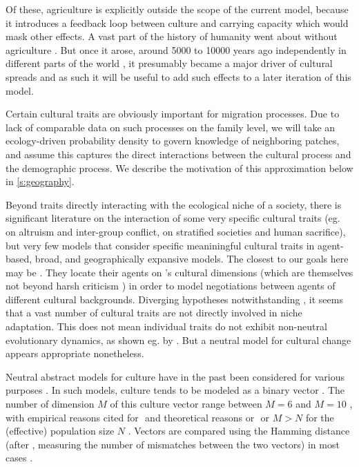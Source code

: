 \documentclass[a4paper,12pt]{scrartcl}
\begin{document}
Of these, agriculture is explicitly outside the scope of the
current model, because it introduces a feedback loop between culture and
carrying capacity which would mask other effects. A vast part of the
history of humanity went about without agriculture \parencite{}. But once it
arose, around 5000 to 10000 years ago independently in different parts of the
world \parencite{}, it presumably became a major driver of cultural spreads
\parencite{farming/language dispersal hypothesis} and as such it will be useful
to add such effects to a later iteration of this model.

Certain cultural traits are obviously important for migration processes. Due to
lack of comparable data on such processes on the family level, we will take an
ecology-driven probability density to govern knowledge of neighboring patches,
and assume this captures the direct interactions between the cultural process
and the demographic process. We describe the motivation of this approximation
below in \cref{s:geography}.

Beyond traits directly interacting with the ecological niche of a society, there
is significant literature on the interaction of some very specific cultural
traits (eg. \textcite{rusch2014evolutionary} on altruism and inter-group
conflict, \textcite{watts2016ritual} on stratified societies and human
sacrifice), but very few models that consider specific meaniningful cultural
traits in agent-based, broad, and geographically expansive models. The closest
to our goals here may be \textcite{hofstede2012cultural}. They locate their
agents on \textcite{hofstede2001culture}'s cultural dimensions (which are
themselves not beyond harsh criticism
\parencite{mcsweeney2002hofstede,baskerville2003hofstede}) in order to model
negotiations between agents of different cultural backgrounds.
Diverging
hypotheses notwithstanding \parencite{tone-humidity,elevation-ejectives,etc}, it
seems that a vast number of cultural traits are not directly involved in niche
adaptation. This does not mean individual traits do not exhibit non-neutral
evolutionary dynamics, as shown eg. by \textcite{kandler2013non}. But a neutral
model for cultural change appears appropriate nonetheless.

Neutral abstract models for culture have in the past been considered for various
purposes \parencite{komarova2001evolutionary}. In such models, culture tends to
be modeled as a binary vector
\parencite{fogarty2017driving,pascual2020epistasis}. The number of dimension $M$
of this culture vector range between $M=6$ \parencite{pascual2020epistasis} and
$M=10$ \parencite{delcastillo2013modeling}, with empirical reasons cited for $ $
\parencite{} and theoretical reasons or $ $ \parencite{} or $M>N$ for the
(effective) population size $N$ \parencite{fogarty2017driving}. Vectors are
compared using the Hamming distance (after \textcite{}, measuring the number of
mismatches between the two vectors) in most cases
\parencite{fogarty2017driving,pascual2020epistasis}.
\end{document}

